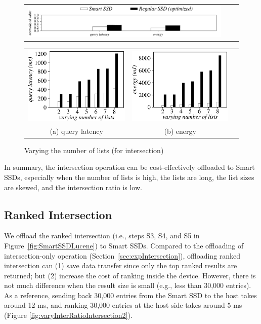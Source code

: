   \begin{figure}[htbp]
  \centering
    \begin{tabular}{ccc}
 \includegraphics[width=0.52\columnwidth]{figures/banner2.pdf}
\end{tabular}
\vspace{-0.1cm}
\renewcommand{\tabcolsep}{0.1mm}
  \begin{tabular}{ccc}
 \includegraphics[width=0.5\columnwidth]{figures/Intersection-time-VaryNumLists.eps}&
  \includegraphics[width=0.5\columnwidth]{figures/Intersection-energy-VaryNumLists.eps}\\
  (a) query latency & (b) energy
\end{tabular}
  \caption{Varying the number of lists (for intersection)}
  \label{fig:varyNumKeywordsIntersection}
 \end{figure}

In summary, the \textsf{intersection} operation can be cost-effectively offloaded to Smart SSDs, especially when the number of lists is high, the lists are long, the list sizes are skewed, and the intersection ratio is low.

\subsection{Ranked Intersection}\label{sec:expRankedIntersection}
We offload the \textsf{ranked intersection} (i.e., steps S3, S4, and S5 in Figure~\ref{fig:SmartSSDLucene}) to Smart SSDs. Compared to the offloading of intersection-only operation (Section~\ref{sec:expIntersection}), offloading ranked intersection can (1) save data transfer since only the top ranked results are returned; but (2) increase the cost of ranking inside the device. However, there is not much difference when the result size is small (e.g., less than 30,000 entries). As a reference, sending back 30,000 entries from the Smart SSD to the host takes around 12 ms, and ranking 30,000 entries at the host side takes around 5 ms (Figure \protect\ref{fig:varyInterRatioIntersection2}).

